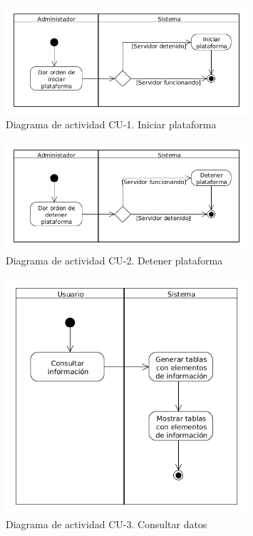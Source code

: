 \begin{figure}[!h]
  \begin{center}
  \includegraphics[width=0.8\textwidth]{imagenes/diagrama_actividad_cu_1.png}
  \caption[diag_act_cu_1]{Diagrama de actividad CU-1. Iniciar plataforma}
  \label{fig:diag_act_cu_1}
  \end{center}
\end{figure}

\begin{figure}[!h]
  \begin{center}
  \includegraphics[width=0.8\textwidth]{imagenes/diagrama_actividad_cu_2.png}
  \caption[diag_act_cu_2]{Diagrama de actividad CU-2. Detener plataforma}
  \label{fig:diag_act_cu_2}
  \end{center}
\end{figure}

\begin{figure}[!h]
  \begin{center}
  \includegraphics[width=0.8\textwidth]{imagenes/diagrama_actividad_cu_3.png}
  \caption[diag_act_cu_3]{Diagrama de actividad CU-3. Consultar datos}
  \label{fig:diag_act_cu_3}
  \end{center}
\end{figure}

